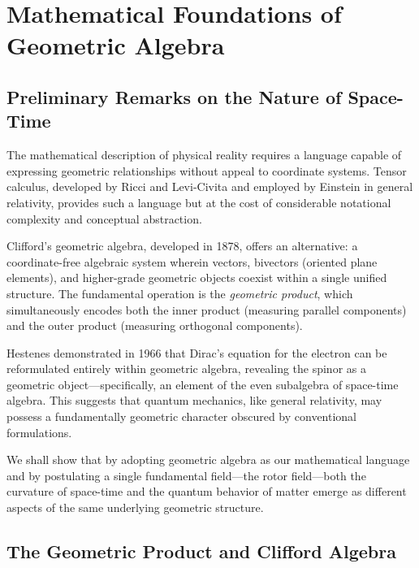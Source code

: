 \documentclass[11pt,a4paper]{article}
\numberwithin{equation}{section}
\theoremstyle{plain}
\theoremstyle{definition}
\theoremstyle{remark}
\begin{document}

\section{Mathematical Foundations of Geometric Algebra}
\label{sec:math-foundations}

\subsection{Preliminary Remarks on the Nature of Space-Time}

The mathematical description of physical reality requires a language capable of expressing geometric relationships without appeal to coordinate systems. Tensor calculus, developed by Ricci and Levi-Civita and employed by Einstein in general relativity, provides such a language but at the cost of considerable notational complexity and conceptual abstraction.

Clifford's geometric algebra, developed in 1878, offers an alternative: a coordinate-free algebraic system wherein vectors, bivectors (oriented plane elements), and higher-grade geometric objects coexist within a single unified structure. The fundamental operation is the \emph{geometric product}, which simultaneously encodes both the inner product (measuring parallel components) and the outer product (measuring orthogonal components).

Hestenes demonstrated in 1966 that Dirac's equation for the electron can be reformulated entirely within geometric algebra, revealing the spinor as a geometric object—specifically, an element of the even subalgebra of space-time algebra. This suggests that quantum mechanics, like general relativity, may possess a fundamentally geometric character obscured by conventional formulations.

We shall show that by adopting geometric algebra as our mathematical language and by postulating a single fundamental field—the rotor field—both the curvature of space-time and the quantum behavior of matter emerge as different aspects of the same underlying geometric structure.

\subsection{The Geometric Product and Clifford Algebra}
\end{document}
